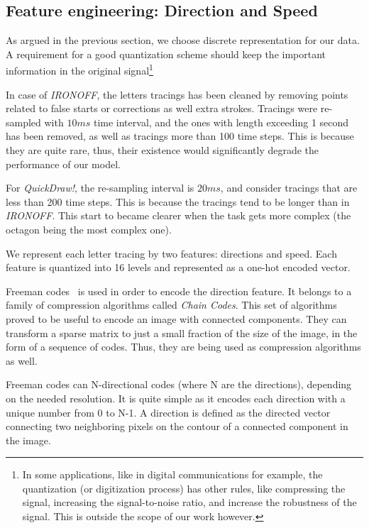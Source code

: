   \subsection{Feature engineering: Direction and Speed}
    \par As argued in the previous section, we choose discrete representation for our data. A requirement for a good quantization scheme should keep the important information in the original signal\footnote{In some applications, like in digital communications for example, the quantization (or digitization process) has other rules, like compressing the signal, increasing the signal-to-noise ratio, and increase the robustness of the signal. This is outside the scope of our work however.}

    \par In case of \textit{IRONOFF}, the letters tracings has been cleaned by removing points related to false starts or corrections as well extra strokes. Tracings were re-sampled with $10ms$ time interval, and the ones with length exceeding 1 second has been removed, as well as tracings more than 100 time steps. This is because they are quite rare, thus, their existence would significantly degrade the performance of our model.

    \par For \textit{QuickDraw!}, the re-sampling interval is $20ms$, and consider tracings that are less than 200 time steps. This is because the tracings tend to be longer than in \textit{IRONOFF}. This start to became clearer when the task gets more complex (the octagon being the most complex one).

    \par We represent each letter tracing by two features: directions and speed. Each feature is quantized into 16 levels and represented as a one-hot encoded vector.

    \par Freeman codes~\citep{freeman1961encoding} is used in order to encode the direction feature. It belongs to a family of compression algorithms called \textit{Chain Codes}. This set of algorithms proved to be useful to encode an image with connected components. They can transform a sparse matrix to just a small fraction of the size of the image, in the form of a sequence of codes. Thus, they are being used as compression algorithms as well.

    \par Freeman codes can N-directional codes (where N are the directions), depending on the needed resolution. It is quite simple as it encodes each direction with a unique number from 0 to N-1. A direction is defined as the directed vector connecting two neighboring pixels on the contour of a connected component in the image.


